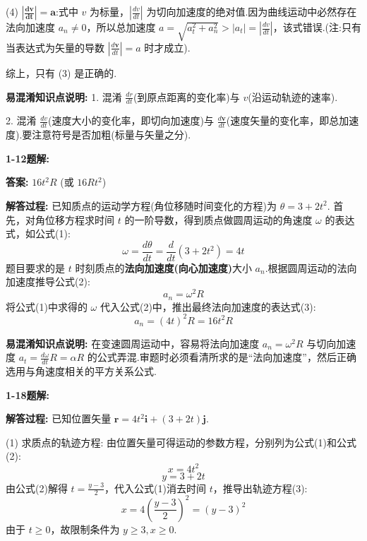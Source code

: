 (4) $\mathbf{\left| \frac{dv}{dt} \right| = a}$:式中 $v$ 为标量，$\left| \frac{dv}{dt} \right|$ 为切向加速度的绝对值.因为曲线运动中必然存在法向加速度 $a_n \neq 0$，所以总加速度 $a = \sqrt{a_t^2 + a_n^2} > |a_t| = \left| \frac{dv}{dt} \right|$，该式错误.(注:只有当表达式为矢量的导数 $\left| \frac{d\mathbf{v}}{dt} \right| = a$ 时才成立).

综上，只有 (3) 是正确的.

\textbf{易混淆知识点说明:}
1. 混淆 $\frac{dr}{dt}$(到原点距离的变化率)与 $v$(沿运动轨迹的速率).

2. 混淆 $\frac{dv}{dt}$(速度大小的变化率，即切向加速度)与 $\frac{d\mathbf{v}}{dt}$(速度矢量的变化率，即总加速度).要注意符号是否加粗(标量与矢量之分).

\vspace{2em}

\textbf{1-12题解:}


\textbf{答案:} $16t^2 R$ (或 $16Rt^2$)

\textbf{解答过程:}
已知质点的运动学方程(角位移随时间变化的方程)为 $\theta = 3 + 2t^2$.
首先，对角位移方程求时间 $t$ 的一阶导数，得到质点做圆周运动的角速度 $\omega$ 的表达式，如公式(1):
\begin{equation}
	\omega = \frac{d\theta}{dt} = \frac{d}{dt}(3 + 2t^2) = 4t
\end{equation}
题目要求的是 $t$ 时刻质点的\textbf{法向加速度(向心加速度)}大小 $a_n$.根据圆周运动的法向加速度推导公式(2):
\begin{equation}
	a_n = \omega^2 R
\end{equation}
将公式(1)中求得的 $\omega$ 代入公式(2)中，推出最终法向加速度的表达式(3):
\begin{equation}
	a_n = (4t)^2 R = 16t^2 R
\end{equation}

\textbf{易混淆知识点说明:}
在变速圆周运动中，容易将法向加速度 $a_n = \omega^2 R$ 与切向加速度 $a_t = \frac{d\omega}{dt} R = \alpha R$ 的公式弄混.审题时必须看清所求的是“法向加速度”，然后正确选用与角速度相关的平方关系公式.

\vspace{2em}

\textbf{1-18题解:}


\textbf{解答过程:}
已知位置矢量 $\mathbf{r} = 4t^2\mathbf{i} + (3 + 2t)\mathbf{j}$.

(1) 求质点的轨迹方程:
由位置矢量可得运动的参数方程，分别列为公式(1)和公式(2):
\begin{equation}
	x = 4t^2
\end{equation}
\begin{equation}
	y = 3 + 2t
\end{equation}
由公式(2)解得 $t = \frac{y-3}{2}$，代入公式(1)消去时间 $t$，推导出轨迹方程(3):
\begin{equation}
	x = 4\left(\frac{y-3}{2}\right)^2 = (y-3)^2
\end{equation}
由于 $t \ge 0$，故限制条件为 $y \ge 3, x \ge 0$.

